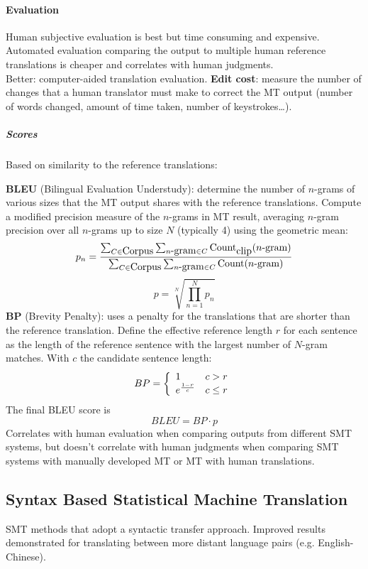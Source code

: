 \documentclass[10pt]{report}
\begin{document}
\paragraph{Evaluation} Human subjective evaluation is best but time consuming and expensive. Automated evaluation comparing the output to multiple human reference translations is cheaper and correlates with human judgments.\\
Better: computer-aided translation evaluation. \textbf{Edit cost}: measure the number of changes that a human translator must make to correct the MT output (number of words changed, amount of time taken, number of keystrokes\ldots).
\subparagraph{Scores} Based on similarity to the reference translations:
\begin{list}{}{}
	\item \textbf{BLEU} (Bilingual Evaluation Understudy): determine the number of $n$-grams of various sizes that the MT output shares with the reference translations. Compute a modified precision measure of the $n$-grams in MT result, averaging $n$-gram precision over all $n$-grams up to size $N$ (typically 4) using the geometric mean:
	$$p_n = \frac{\sum_{C\in\hbox{Corpus}}\sum_{n\hbox{-gram}\in C}\hbox{Count}_{\hbox{clip}}(n\hbox{-gram})}{\sum_{C\in\hbox{Corpus}}\sum_{n\hbox{-gram}\in C}\hbox{Count}(n\hbox{-gram})}$$
	$$p = \sqrt[N]{\prod_{n=1}^Np_n}$$
	\textbf{BP} (Brevity Penalty): uses a penalty for the translations that are shorter than the reference translation. Define the effective reference length $r$ for each sentence as the length of the reference sentence with the largest number of $N$-gram matches. With $c$ the candidate sentence length:
	$$BP = \left\{\begin{array}{l l}
	1&c > r\\
	e^{\frac{1-r}{c}}& c\leq r
	\end{array}\right.$$
	The final BLEU score is 
	$$BLEU = BP\cdot p$$
	Correlates with human evaluation when comparing outputs from different SMT systems, but doesn't correlate with human judgments when comparing SMT systems with manually developed MT or MT with human translations.
\end{list}
\subsection{Syntax Based Statistical Machine Translation} SMT methods that adopt a syntactic transfer approach. Improved results demonstrated for translating between more distant language pairs (e.g. English-Chinese).
\end{document}

